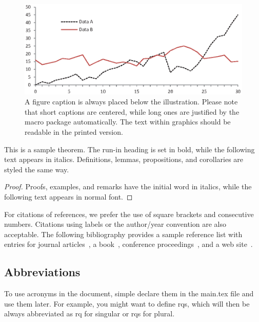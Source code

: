 \begin{figure}
\includegraphics[width=\textwidth]{figures/fig1.eps}
\caption{A figure caption is always placed below the illustration.
Please note that short captions are centered, while long ones are justified by the macro package automatically. The text within graphics should be readable in the printed version.} 
\label{fig1}
\end{figure}

\begin{theorem}
This is a sample theorem. 
The run-in heading is set in bold, while the following text appears in italics. 
Definitions, lemmas, propositions, and corollaries are styled the same way.
\end{theorem}
%
%
\begin{proof}
Proofs, examples, and remarks have the initial word in italics, while the following text appears in normal font.
\end{proof}
For citations of references, we prefer the use of square brackets and consecutive numbers. 
Citations using labels or the author/year convention are also acceptable. 
The following bibliography provides a sample reference list with entries for journal articles~\cite{Stol2016}, a book~\cite{Myers2012}, conference proceedings~\cite{Harrold1988}, and a web site~\cite{Schaffer2018}.

\subsection{Abbreviations}
\label{sec:intro:sub:abbrev}

To use acronyms in the document, simple declare them in the main.tex file and use them later.
For example, you might want to define \acp{rq}, which will then be always abbreviated as \ac{rq} for singular or \acp{rq} for plural.

